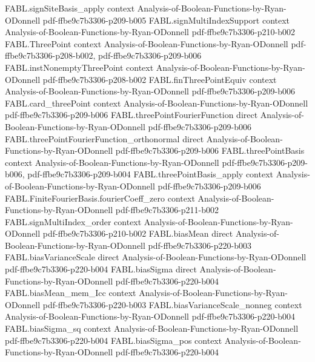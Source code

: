 \begin{theorem}
\proofstep
  {FABL.signSiteBasis_apply}
  {context}
  {Analysis-of-Boolean-Functions-by-Ryan-ODonnell}
  {pdf-ffbe9c7b3306-p209-b005}
\proofstep
  {FABL.signMultiIndexSupport}
  {context}
  {Analysis-of-Boolean-Functions-by-Ryan-ODonnell}
  {pdf-ffbe9c7b3306-p210-b002}
\proofstep
  {FABL.ThreePoint}
  {context}
  {Analysis-of-Boolean-Functions-by-Ryan-ODonnell}
  {pdf-ffbe9c7b3306-p208-b002,
    pdf-ffbe9c7b3306-p209-b006}
\proofstep
  {FABL.instNonemptyThreePoint}
  {context}
  {Analysis-of-Boolean-Functions-by-Ryan-ODonnell}
  {pdf-ffbe9c7b3306-p208-b002}
\proofstep
  {FABL.finThreePointEquiv}
  {context}
  {Analysis-of-Boolean-Functions-by-Ryan-ODonnell}
  {pdf-ffbe9c7b3306-p209-b006}
\proofstep
  {FABL.card_threePoint}
  {context}
  {Analysis-of-Boolean-Functions-by-Ryan-ODonnell}
  {pdf-ffbe9c7b3306-p209-b006}
\proofstep
  {FABL.threePointFourierFunction}
  {direct}
  {Analysis-of-Boolean-Functions-by-Ryan-ODonnell}
  {pdf-ffbe9c7b3306-p209-b006}
\proofstep
  {FABL.threePointFourierFunction_orthonormal}
  {direct}
  {Analysis-of-Boolean-Functions-by-Ryan-ODonnell}
  {pdf-ffbe9c7b3306-p209-b006}
\proofstep
  {FABL.threePointBasis}
  {context}
  {Analysis-of-Boolean-Functions-by-Ryan-ODonnell}
  {pdf-ffbe9c7b3306-p209-b006,
    pdf-ffbe9c7b3306-p209-b004}
\proofstep
  {FABL.threePointBasis_apply}
  {context}
  {Analysis-of-Boolean-Functions-by-Ryan-ODonnell}
  {pdf-ffbe9c7b3306-p209-b006}
\proofstep
  {FABL.FiniteFourierBasis.fourierCoeff_zero}
  {context}
  {Analysis-of-Boolean-Functions-by-Ryan-ODonnell}
  {pdf-ffbe9c7b3306-p211-b002}
\proofstep
  {FABL.signMultiIndex_order}
  {context}
  {Analysis-of-Boolean-Functions-by-Ryan-ODonnell}
  {pdf-ffbe9c7b3306-p210-b002}
\proofstep
  {FABL.biasMean}
  {direct}
  {Analysis-of-Boolean-Functions-by-Ryan-ODonnell}
  {pdf-ffbe9c7b3306-p220-b003}
\proofstep
  {FABL.biasVarianceScale}
  {direct}
  {Analysis-of-Boolean-Functions-by-Ryan-ODonnell}
  {pdf-ffbe9c7b3306-p220-b004}
\proofstep
  {FABL.biasSigma}
  {direct}
  {Analysis-of-Boolean-Functions-by-Ryan-ODonnell}
  {pdf-ffbe9c7b3306-p220-b004}
\proofstep
  {FABL.biasMean_mem_Icc}
  {context}
  {Analysis-of-Boolean-Functions-by-Ryan-ODonnell}
  {pdf-ffbe9c7b3306-p220-b003}
\proofstep
  {FABL.biasVarianceScale_nonneg}
  {context}
  {Analysis-of-Boolean-Functions-by-Ryan-ODonnell}
  {pdf-ffbe9c7b3306-p220-b004}
\proofstep
  {FABL.biasSigma_sq}
  {context}
  {Analysis-of-Boolean-Functions-by-Ryan-ODonnell}
  {pdf-ffbe9c7b3306-p220-b004}
\proofstep
  {FABL.biasSigma_pos}
  {context}
  {Analysis-of-Boolean-Functions-by-Ryan-ODonnell}
  {pdf-ffbe9c7b3306-p220-b004}

\end{theorem}
